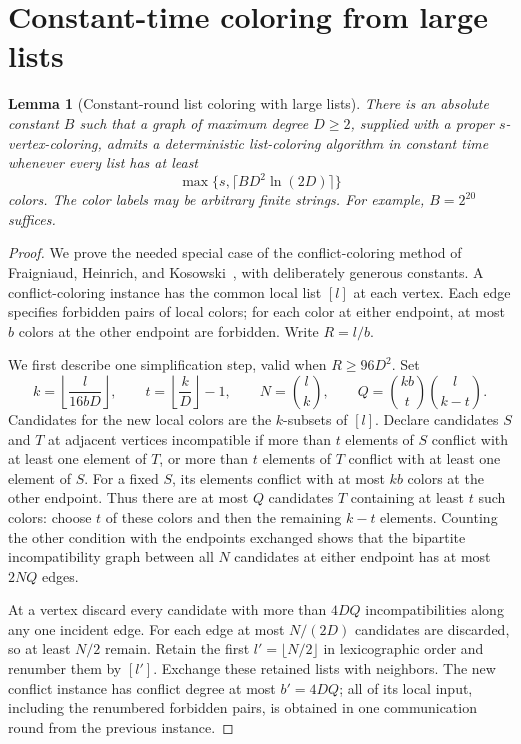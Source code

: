 \documentclass[11pt]{article}
\newtheorem{lemma}[theorem]{Lemma}
\theoremstyle{definition}
\theoremstyle{remark}
\begin{document}
\section{Constant-time coloring from large lists}\label{app:fhk}
\begin{lemma}[Constant-round list coloring with large lists]
\label{lem:fhk-elementary}
There is an absolute constant $B$ such that a graph of maximum degree
$D\ge2$, supplied with a proper $s$-vertex-coloring, admits a
deterministic list-coloring algorithm in constant time whenever every
list has at least
\[
 \max\{s,\lceil B D^2\ln(2D)\rceil\}
\]
colors.  The color labels may be arbitrary finite strings.  For
example, $B=2^{20}$ suffices.
\end{lemma}

\begin{proof}
We prove the needed special case of the conflict-coloring method of
Fraigniaud, Heinrich, and Kosowski~\cite{FHK}, with deliberately generous
constants.  A conflict-coloring instance has the common local list
$[l]$ at each vertex.  Each edge specifies forbidden pairs of local
colors; for each color at either endpoint, at most $b$ colors at the
other endpoint are forbidden.  Write $R=l/b$.

We first describe one simplification step, valid when $R\ge96D^2$.
Set
\[
 k=\left\lfloor\frac{l}{16bD}\right\rfloor,
 \qquad t=\left\lfloor\frac{k}{D}\right\rfloor-1,
 \qquad N=\binom lk,
 \qquad Q=\binom{kb}{t}\binom l{k-t}.
\]
Candidates for the new local colors are the $k$-subsets of $[l]$.
Declare candidates $S$ and $T$ at adjacent vertices incompatible if
more than $t$ elements of $S$ conflict with at least one element of $T$,
or more than $t$ elements of $T$ conflict with at least one element of
$S$.  For a fixed $S$, its elements conflict with at most $kb$ colors
at the other endpoint.  Thus there are at most $Q$ candidates $T$
containing at least $t$ such colors: choose $t$ of these colors and
then the remaining $k-t$ elements.  Counting the other condition with
the endpoints exchanged shows that the bipartite incompatibility graph
between all $N$ candidates at either endpoint has at most $2NQ$ edges.

At a vertex discard every candidate with more than $4DQ$
incompatibilities along any one incident edge.  For each edge at most
$N/(2D)$ candidates are discarded, so at least $N/2$ remain.  Retain
the first $l'=\lfloor N/2\rfloor$ in lexicographic order and renumber
them by $[l']$.  Exchange these retained lists with neighbors.
The new conflict instance has conflict degree at most $b'=4DQ$;
all of its local input, including the renumbered forbidden pairs,
is obtained in one communication round from the previous instance.


\end{proof}
\end{document}

